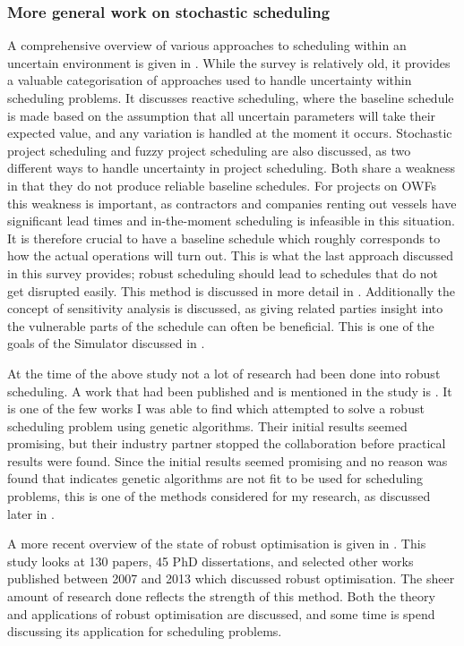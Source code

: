\documentclass[a4paper,12pt]{article}
\begin{document}
\subsubsection{More general work on stochastic scheduling} \label{sss:stoch}
A comprehensive overview of various approaches to scheduling within an uncertain environment is given in \cite{herroelen2005project}. While the survey is relatively old, it provides a valuable categorisation of approaches used to handle uncertainty within scheduling problems. It discusses reactive scheduling, where the baseline schedule is made based on the assumption that all uncertain parameters will take their expected value, and any variation is handled at the moment it occurs. Stochastic project scheduling and fuzzy project scheduling are also discussed, as two different ways to handle uncertainty in project scheduling. Both share a weakness in that they do not produce reliable baseline schedules. For projects on OWFs this weakness is important, as contractors and companies renting out vessels have significant lead times and in-the-moment scheduling is infeasible in this situation. It is therefore crucial to have a baseline schedule which roughly corresponds to how the actual operations will turn out. This is what the last approach discussed in this survey provides; robust scheduling should lead to schedules that do not get disrupted easily. This method is discussed in more detail in . Additionally the concept of sensitivity analysis is discussed, as giving related parties insight into the vulnerable parts of the schedule can often be beneficial. This is one of the goals of the Simulator discussed in . 

At the time of the above study not a lot of research had been done into robust scheduling. A work that had been published and is mentioned in the study is \cite{sevaux2002genetic}. It is one of the few works I was able to find which attempted to solve a robust scheduling problem using genetic algorithms. Their initial results seemed promising, but their industry partner stopped the collaboration before practical results were found. Since the initial results seemed promising and no reason was found that indicates genetic algorithms are not fit to be used for scheduling problems, this is one of the methods considered for my research, as discussed later in .

\bigskip

A more recent overview of the state of robust optimisation is given in \cite{gabrel2014recent}. This study looks at 130 papers, 45 PhD dissertations, and selected other works published between 2007 and 2013 which discussed robust optimisation. The sheer amount of research done reflects the strength of this method. Both the theory and applications of robust optimisation are discussed, and some time is spend discussing its application for scheduling problems. 
\end{document}
